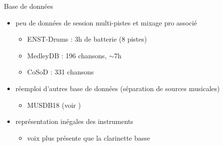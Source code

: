 \documentclass[9pt, aspectratio=169]{beamer}
\begin{document}
\begin{frame}{Base de données} %

	\begin{itemize}
		\item peu de données de session multi-pistes et mixage pro associé
		\begin{itemize}
			\item ENST-Drums : 3h de batterie (8 pistes)
			\item MedleyDB : 196 chansons, $\sim$7h \cite{bittner_medleydb_2014}
			\item CoSoD : 331 chansons \cite{duguay_collaborative_2023}
		\end{itemize}
		\item réemploi d'autres base de données (séparation de sources musicales)
		\begin{itemize}
			\item MUSDB18 (voir \cite{martinez-ramirez_automatic_2022})
		\end{itemize}
		\item représentation inégales des instruments \cite{bittner_medleydb_2014}
		\begin{itemize}
			\item voix plus présente que la clarinette basse
		\end{itemize}
	\end{itemize}

\end{frame}

\end{document}
